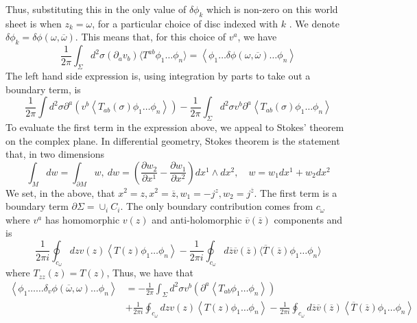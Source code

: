 \documentclass[11pt, oneside]{article}   	%
\theoremstyle{slanted}
\begin{document}
Thus, substituting this in 
the only value of $ \delta \phi _ k $ which 
is non-zero on this world sheet is when 
$ z _ k  = \omega $, for 
a particular choice of disc indexed 
with $ k$ . We denote 
$ \delta \phi _ k  = \delta \phi \left( \omega, \overline{ \omega }  \right)  $. 
This means that, for this choice of $ v ^ a $, 
we have 
\[
 \frac{1}{2 \pi } \int _{ \Sigma } d ^ 2 \sigma 
 \left( \partial  _ a v _ b  \right) \langle T ^{ ab }
 \phi _ 1 \dots \phi _ n \rangle = 
 \left< \phi _ 1 \dots \delta \phi \left( \omega , 
 \overline{ \omega } \right)  \dots \phi _ n  \right>
\] 
The left hand side expression is, 
using integration by parts 
to take out a boundary term, is 
\[
 \frac{1}{2 \pi } \int d ^ 2 \sigma 
 \partial  ^ a \left(  v ^ b \left< 
 T _{ ab } \left( \sigma  \right)  \phi _  1 \dots \phi _ n \right>   \right)  
   - \frac{1}{2 \pi } \int_{ \Sigma } d ^ 2 \sigma 
   v ^ b \partial  ^ a \left< 
   T _{ ab } \left( \sigma  \right)  \phi _ 1 \dots \phi _ n \right> 
\] To evaluate the first 
term in the expression above, we 
appeal to Stokes' theorem 
on the complex plane. In differential 
geometry, Stokes theorem 
is the statement that, in two dimensions
\[
 \int_{ M}  dw = \int _{ \partial  M } w , \ d w  = 
 \left( \frac{\partial w _ 2 }{\partial  x ^ 1  }  - \frac{\partial w_ 1 }{\partial  
 x ^  2 }   \right)  dx ^ 1 \wedge  dx ^ 2, 
 \quad w = w_1 dx ^ 1 + w_2 dx ^ 2 
\] We set, in the above, 
that $ x^ 2  = z , x^ 2 = \overline{ z } , w _ 1  = - j ^  z, w_2  = j ^{ \overline{ z } }$. 
The first term 
is a boundary term $ \partial  \Sigma  = 
\cup _ i C _ i $. 
The only boundary 
contribution comes from 
$ c _{ \omega } $ where $ v ^ a $ has homomorphic 
$ v \left(  z  \right)  $ and anti-holomorphic 
$ \overline{ v } \left( \overline{ z }  \right)  $ components
and is 
\[
	\frac{1}{2 \pi i } \oint _{ c _ \omega } dz v \left(  z  \right) 
	\left< T \left(  z  \right)  \phi _ 1 \dots \phi _ n  \right> 
	 - \frac{1}{2 \pi i } \oint _{ c _ \omega } 
	 d \overline{ z } \overline{ v } \left( \overline{ z } \right)  \langle \overline{ T } \left( \overline{ z }  \right)  
	 \phi _ 1 \dots \phi _ n \rangle 
 \] where $ T _{ zz } \left( z  \right)   =  T\left(  z  \right)   $, 
 Thus, we have 
 that 
 \begin{align*}
 	\left< \phi _ 1 \dots 
	\dots \delta _ v \phi \left( \overline{ \omega } , \omega  \right)
	\dots \phi _ n \right> &=   -\frac{1}{2 \pi } 
	\int _{ \Sigma } d ^ 2 \sigma v ^ b 
	\left( \partial  ^ a \left< T _{ ab } \phi _ 1 \dots 
	\phi _ n \right>  \right)  \\
			       & + \frac{1}{2 \pi i } \oint_{ c _{ \omega } } 
			       d zv \left(  z  \right)  \left< T ( z) 
			       \phi _ 1 \dots \phi _ n \right>
			        - \frac{1}{ 2 \pi i } \oint _{ c _ \omega  } 
				d \overline{ z  } \overline{ v } 
				\left( \overline{ z }  \right)  \left< 
				\overline{ T } \left(  \overline{ z }  \right)  
				\phi _ 1 \dots \phi _ n \right> 
 \end{align*}
\end{document}
